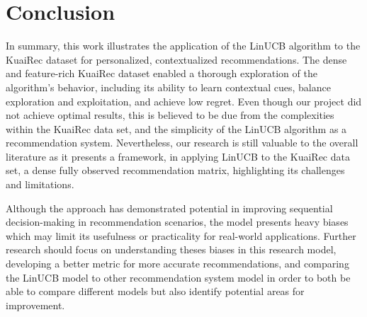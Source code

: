 \section{Conclusion}

In summary, this work illustrates the application of the LinUCB algorithm to the KuaiRec dataset for personalized, contextualized recommendations. The dense and feature-rich KuaiRec dataset enabled a thorough exploration of the algorithm’s behavior, including its ability to learn contextual cues, balance exploration and exploitation, and achieve low regret. Even though our project did not achieve optimal results, this is believed  to be due from the complexities within the KuaiRec data set, and the simplicity of the LinUCB algorithm as a recommendation system. Nevertheless, our research is still valuable to the overall literature as it presents a framework, in applying LinUCB to the KuaiRec data set, a dense fully observed recommendation matrix, highlighting its challenges and limitations.

Although the approach has demonstrated potential in improving sequential decision-making in recommendation scenarios, the model presents heavy biases which may limit its usefulness or practicality for real-world applications. Further research should focus on understanding theses biases in this research model, developing a better metric for more accurate recommendations, and comparing the LinUCB model to other recommendation system model in order to both be able to compare different models but also identify potential areas for improvement.